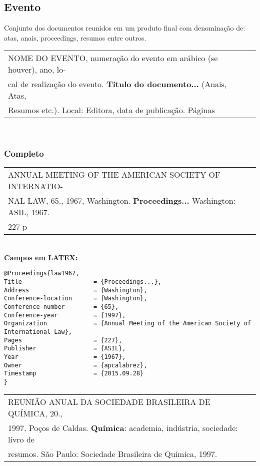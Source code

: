 \subsection{Evento}

Conjunto dos documentos reunidos em um produto final com denominação
de: atas, anais, proceedings, resumos entre outros. \\

\begin{tabular}{|l|c|} \hline
NOME DO EVENTO, numeração do evento em arábico (se
houver), ano, lo-\\cal de realização do evento. \textbf{Título do documento...} (Anais, Atas, \\Resumos etc.). Local: Editora, data de publicação. Páginas \\\hline
\end{tabular} \\ 

\subsubsection{Completo} 
	 
\begin{tabular}{|l|c|} \hline
ANNUAL MEETING OF THE AMERICAN SOCIETY OF INTERNATIO-\\NAL LAW, 65., 1967,  Washington. \textbf{Proceedings...} Washington: ASIL, 1967. \\227 p \\\hline
\end{tabular} \\

\textbf{Campos em LATEX:} 

\begin{verbatim}
@Proceedings{law1967,
Title                    = {Proceedings...},
Address                  = {Washington},
Conference-location      = {Washington},
Conference-number        = {65},
Conference-year          = {1997},
Organization             = {Annual Meeting of the American Society of 
International Law},
Pages                    = {227},
Publisher                = {ASIL},
Year                     = {1967},
Owner                    = {apcalabrez},
Timestamp                = {2015.09.28}
}
\end{verbatim}

\begin{tabular}{|l|c|} \hline
REUNIÃO ANUAL DA SOCIEDADE BRASILEIRA DE QUÍMICA, 20., \\1997, Poços de Caldas. \textbf{Química}: academia, indústria, sociedade: livro de \\resumos. São Paulo: Sociedade Brasileira de Química, 1997.  \\\hline
\end{tabular} \\

